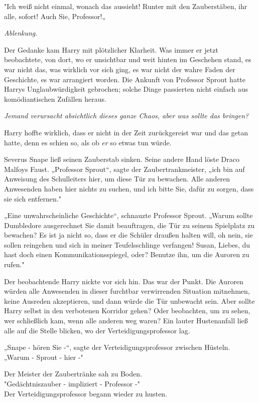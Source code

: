 {"Ich weiß nicht einmal, wonach das aussieht! Runter mit den Zauberstäben, ihr alle, sofort! Auch Sie, Professor!„

\emph{Ablenkung.}

Der Gedanke kam Harry mit plötzlicher Klarheit. Was immer er jetzt beobachtete, von dort, wo er unsichtbar und weit hinten im Geschehen stand, es war nicht das, was wirklich vor sich ging, es war nicht der wahre Faden der Geschichte, es war arrangiert worden. Die Ankunft von Professor Sprout hatte Harrys Unglaubwürdigkeit gebrochen; solche Dinge passierten nicht einfach aus komödiantischen Zufällen heraus.

\emph{Jemand verursacht absichtlich dieses ganze Chaos, aber was sollte das bringen?}

Harry hoffte wirklich, dass er nicht in der Zeit zurückgereist war und das getan hatte, denn es schien so, als ob \emph{er} so etwas tun würde.

Severus Snape ließ seinen Zauberstab sinken. Seine andere Hand löste Draco Malfoys Faust. „Professor Sprout“, sagte der Zaubertrankmeister, „ich bin auf Anweisung des Schulleiters hier, um diese Tür zu bewachen. Alle anderen Anwesenden haben hier nichts zu suchen, und ich bitte Sie, dafür zu sorgen, dass sie sich entfernen."

„Eine unwahrscheinliche Geschichte“, schnauzte Professor Sprout. „Warum sollte Dumbledore ausgerechnet Sie damit beauftragen, die Tür zu seinem Spielplatz zu bewachen? Es ist ja nicht so, dass er die Schüler draußen halten will, oh nein, sie sollen reingehen und sich in meiner Teufelsschlinge verfangen! Susan, Liebes, du hast doch einen Kommunikationsspiegel, oder? Benutze ihn, um die Auroren zu rufen."

Der beobachtende Harry nickte vor sich hin. Das war der Punkt. Die Auroren würden alle Anwesenden in dieser furchtbar verwirrenden Situation mitnehmen, keine Ausreden akzeptieren, und dann würde die Tür unbewacht sein. Aber sollte Harry selbst in den verbotenen Korridor gehen? Oder beobachten, um zu sehen, wer schließlich kam, wenn alle anderen weg waren? Ein lauter Hustenanfall ließ alle auf die Stelle blicken, wo der Verteidigungsprofessor lag.

„Snape - hören Sie -“, sagte der Verteidigungsprofessor zwischen Hüsteln. „Warum - Sprout - hier -"

Der Meister der Zaubertränke sah zu Boden.\\ "Gedächtniszauber - impliziert - Professor -"\\ Der Verteidigungsprofessor begann wieder zu husten.

}
